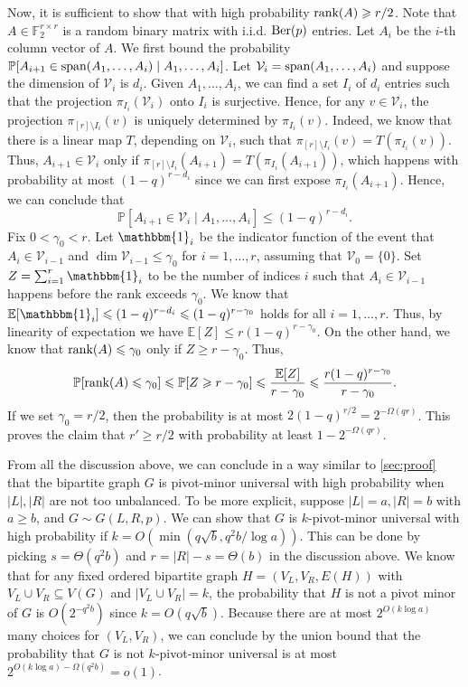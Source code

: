 \documentclass[reqno]{amsart}
\theoremstyle{definition}
\numberwithin{theorem}{section}
\renewcommand{\leq}{\le}
\renewcommand{\geq}{\ge}
\newcommand{\cV}{\mathcal V}
\newcommand{\FF}{\mathbb F}
\renewcommand{\le}{\leqslant}
\renewcommand{\ge}{\geqslant}
\newcommand{\EE}{\mathbb E}
\newcommand{\PP}{\mathbb P}
\newcommand{\abs}[1]{\left|#1\right|}
\newcommand{\Ber}{\textup{Ber}}
\newcommand{\rank}{\textup{rank}}
\newcommand{\Span}{\textup{span}}
\begin{document}
Now, it is sufficient to show that with high probability $\rank(A)\geq r/2$. Note that $A\in\FF_2^{r\times r}$ is a random binary matrix with i.i.d. $\Ber(p)$ entries. Let $A_i$ be the $i$-th column vector of $A$. We first bound the probability $\PP[A_{i+1}\in\Span(A_1,\dots,A_{i})\mid A_1,\dots,A_{i}]$. Let $\cV_{i}=\Span(A_1,\dots,A_{i})$ and suppose the dimension of $\cV_{i}$ is $d_{i}$. Given $A_1,\dots,A_{i}$, we can find a set $I_i$ of $d_{i}$ entries such that the projection $\pi_{I_i}(\cV_{i})$ onto $I_i$ is surjective. Hence, for any $v\in \cV_{i}$, the projection $\pi_{[r]\setminus I_i}(v)$ is uniquely determined by $\pi_{I_i}(v)$. Indeed, we know that there is a linear map $T$, depending on $\cV_i$, such that $\pi_{[r]\setminus I_i}(v)=T(\pi_{I_i}(v))$. Thus, $A_{i+1}\in \cV_i$ only if $\pi_{[r]\setminus I_i}(A_{i+1})=T(\pi_{I_i}(A_{i+1}))$, which happens with probability at most $(1-q)^{r-d_i}$ since we can first expose $\pi_{I_i}(A_{i+1})$. Hence, we can conclude that
\[\PP[A_{i+1}\in \cV_i\mid A_1,\dots,A_{i}]\leq (1-q)^{r-d_i}.\]
Fix $0<\gamma_0<r$. Let $\mathbbm{1}_{i}$ be the indicator function of the event that $A_{i}\in\cV_{i-1}$ and $\dim\cV_{i-1}\leq \gamma_0$ for $i=1,\dots,r$, assuming that $\cV_0=\{0\}$. Set $Z=\sum_{i=1}^r \mathbbm{1}_{i}$ to be the number of indices $i$ such that $A_{i}\in\cV_{i-1}$ happens before the rank exceeds $\gamma_0$. We know that $\EE[\mathbbm{1}_{i}]\leq (1-q)^{r-d_i}\leq (1-q)^{r-\gamma_0}$ holds for all $i=1,\dots,r$. Thus, by linearity of expectation we have $\EE [Z]\leq r(1-q)^{r-\gamma_0}$. On the other hand, we know that $\rank(A)\leq \gamma_0$ only if $Z\geq r-\gamma_0$. Thus,
\[\PP[\rank(A)\leq \gamma_0]\leq\PP[Z\geq r-\gamma_0]\leq \frac{\EE[Z]}{r-\gamma_0}\leq \frac{r(1-q)^{r-\gamma_0}}{r-\gamma_0}.\]
If we set $\gamma_0=r/2$, then the probability is at most $2(1-q)^{r/2}=2^{-\Omega(qr)}$. This proves the claim that $r'\geq r/2$ with probability at least $1-2^{-\Omega(qr)}$.

From all the discussion above, we can conclude in a way similar to \cref{sec:proof} that the bipartite graph $G$ is pivot-minor universal with high probability when $\abs{L},\abs{R}$ are not too unbalanced. To be more explicit, suppose $\abs{L}=a, \abs{R}=b$ with $a\geq b$, and $G\sim G(L,R,p)$. We can show that $G$ is $k$-pivot-minor universal with high probability if $k=O(\min(q\sqrt{b},q^2b/\log a))$. This can be done by picking $s=\Theta(q^2b)$ and $r=\abs{R}-s=\Theta(b)$ in the discussion above. We know that for any fixed ordered bipartite graph $H = (V_L,V_R,E(H))$ with $V_L\cup V_R\subseteq V(G)$ and $\abs{V_L\cup V_R}=k$, the probability that $H$ is not a pivot minor of $G$ is $O(2^{-q^2b})$ since $k=O(q\sqrt{b})$. Because there are at most $2^{O(k\log a)}$ many choices for $(V_L,V_R)$, we can conclude by the union bound that the probability that $G$ is not $k$-pivot-minor universal is at most $2^{O(k\log a)-\Omega(q^2b)}=o(1)$.
\end{document}
